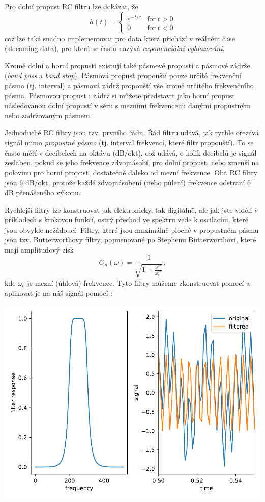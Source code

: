 Pro dolní propust RC filtru lze dokázat, že
\begin{equation}
    h(t) = \left\{\begin{matrix}
        e^{-t/\tau} & \mathrm{for}\; t > 0 \\
        0 & \mathrm{for}\; t < 0
    \end{matrix}\right.
\end{equation}
což lze také snadno implementovat pro data která přichází v reálném čase (streaming data), pro která se často nazývá \emph{exponenciální vyhlazování}.

Kromě dolní a horní propusti existují také pásmové propusti a pásmové zádrže (\emph{band pass} a \emph{band stop}). Pásmová propust propouští pouze určité frekvenční pásmo (tj. interval) a pásmová zádrž propouští vše kromě určitého frekvenčního pásma. Pásmovou propust i zádrž si můžete představit jako horní propust následovanou dolní propustí v sérii s mezními frekvencemi danými propustným nebo zadržovaným pásmem.

Jednoduché RC filtry jsou tzv. prvního řádu. Řád filtru udává, jak rychle ořezává signál mimo \emph{propustné pásmo} (tj. interval frekvencí, které filtr propouští). To se často měří v decibelech na oktávu (dB/okt), což udává, o kolik decibelů je signál zeslaben, pokud se jeho frekvence zdvojnásobí, pro dolní propust, nebo zmenší na polovinu pro horní propust, dostatečně daleko od mezní frekvence. Oba RC filtry jsou 6 dB/okt, protože každé zdvojnásobení (nebo půlení) frekvence odstraní 6 dB přenášeného výkonu.

Rychlejší filtry lze konstruovat jak elektronicky, tak digitálně, ale jak jste viděli v příkladech s krokovou funkcí, ostrý přechod ve spektru vede k oscilacím, které jsou obvykle nežádoucí. Filtry, které jsou maximálně ploché v propustném pásmu jsou tzv. Butterworthovy filtry, pojmenované po Stephenu Butterworthovi, které mají amplitudový zisk
\begin{equation*}
    G_n(\omega) = \frac{1}{\sqrt{1 + \frac{\omega^{2n}}{\omega_c^{2n}}}},
\end{equation*}
kde $\omega_c$ je mezní (úhlová) frekvence. Tyto filtry můžeme zkonstruovat pomocí  a aplikovat je na náš signál pomocí 
:
\begin{center}
    \includegraphics[width=0.5\linewidth]{butter.pdf}
\end{center}

